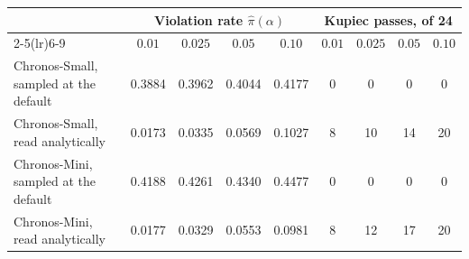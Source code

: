 \footnotesize
\setlength{\tabcolsep}{4pt}
\begin{tabular}{@{}p{4.3cm}cccc cccc@{}}
\toprule
& \multicolumn{4}{c}{Violation rate $\hat\pi(\alpha)$} & \multicolumn{4}{c}{Kupiec passes, of 24} \\
\cmidrule(lr){2-5}\cmidrule(lr){6-9}
& $0.01$ & $0.025$ & $0.05$ & $0.10$ & $0.01$ & $0.025$ & $0.05$ & $0.10$ \\
\midrule
Chronos-Small, sampled at the default & 0.3884 & 0.3962 & 0.4044 & 0.4177 & 0 & 0 & 0 & 0 \\
Chronos-Small, read analytically & 0.0173 & 0.0335 & 0.0569 & 0.1027 & 8 & 10 & 14 & 20 \\
Chronos-Mini, sampled at the default & 0.4188 & 0.4261 & 0.4340 & 0.4477 & 0 & 0 & 0 & 0 \\
Chronos-Mini, read analytically & 0.0177 & 0.0329 & 0.0553 & 0.0981 & 8 & 12 & 17 & 20 \\
\bottomrule
\end{tabular}
\normalsize
